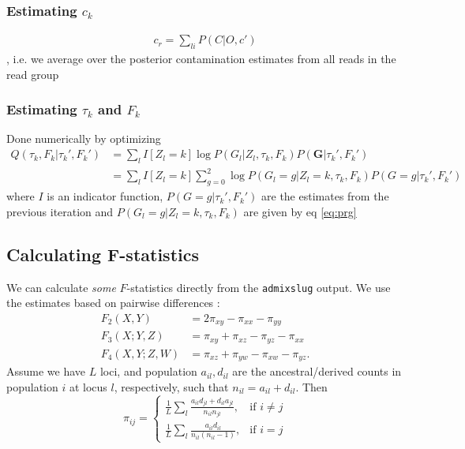 \documentclass[10pt,a4paper]{article}
\begin{document}
\subsubsection*{Estimating $c_k$}
\begin{align*}
c_r =  \sum_{li} P(C| O, c')
\end{align*},
i.e. we average over the posterior contamination estimates from all reads in the read group
\subsubsection*{Estimating $\tau_k$ and $F_k$}
Done numerically by optimizing
\begin{align*}
Q(\tau_k, F_k | \tau_k', F_k') 
&= \sum_{l} I[Z_l=k] \log P( G_l | Z_l, \tau_k, F_k) P(\mathbf{G} | \tau_k', F_k') \\
&= \sum_{l} I[Z_l=k]\sum_{g=0}^2 \log P( G_l=g | Z_l=k, \tau_k, F_k)P(G=g | \tau_k', F_k')
\end{align*}
where $I$ is an indicator function, $P(G=g | \tau_k', F_k')$ are the estimates from the previous iteration and $ P( G_l=g | Z_l=k, \tau_k, F_k)$ are given by eq \ref{eq:prg}

\subsection*{Calculating F-statistics}
We can calculate \emph{some} $F$-statistics directly from the \texttt{admixslug} output. We use the estimates based on pairwise differences \citep{peter2016}:
\begin{align}
F_2(X, Y) &= 2\pi_{xy} -\pi_{xx} - \pi_{yy}\\
F_3(X; Y, Z) &= \pi_{xy} +\pi_{xz} - \pi_{yz} - \pi_{xx}\\
F_4(X, Y; Z, W) &= \pi_{xz} +\pi_{yw} - \pi_{xw} - \pi_{yz}.
\end{align}
Assume we have $L$ loci, and population $a_{il}, d_{il}$ are the ancestral/derived counts in population $i$ at locus $l$, respectively, such that $n_{il} = a_{il} + d_{il}$. Then
\begin{equation}
\pi_{ij} = \begin{cases}
\frac{1}{L}\sum_l \frac{a_{il}d_{jl} + d_{il}a_{jl}} {n_{il}n_{jl}} ,& \text{if } i \neq j\\
\frac{1}{L}\sum_l \frac{a_{il}d_{il}}{n_{il}(n_{il} -1)},              & \text{if }i =j
\end{cases}
\end{equation}
\end{document}
